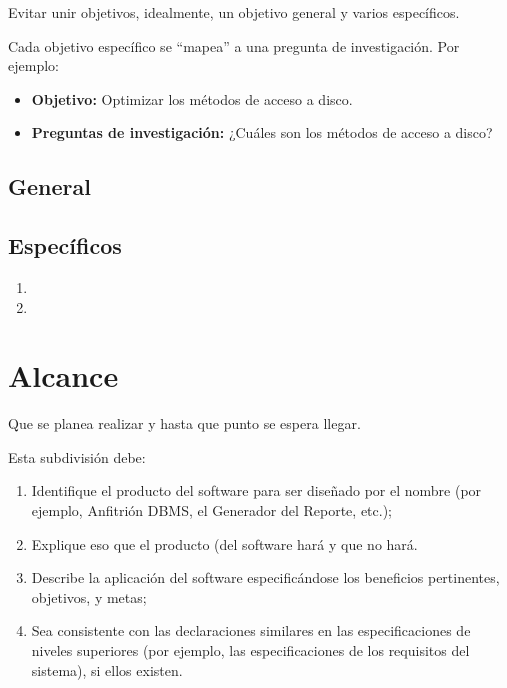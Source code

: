\documentclass[letter,12pt]{report}
\newcommand\naranjo[1]{\textcolor[rgb]{1.00,0.36,0.06}{\textbf{#1}}}
\begin{document}
Evitar unir objetivos, idealmente, un objetivo general y varios específicos.

Cada objetivo específico se ``mapea'' a una pregunta de investigación.
Por ejemplo:
  \begin{itemize}
  \item \textbf{\naranjo{Objetivo:}} Optimizar los métodos de acceso a disco.
  \item \textbf{\naranjo{Preguntas de investigación:}} ¿Cuáles son los métodos de acceso a disco?
\end{itemize}
\subsection{General}
\blindtext %

\subsection{Específicos}
\begin{enumerate}\justifying
  \item \blindtext %
 
  \item \blindtext %

\end{enumerate}

\section{Alcance}
Que se planea realizar y hasta que punto se espera llegar.

Esta subdivisión debe:
\begin{enumerate}\justifying
  \item Identifique el producto del software para ser diseñado por el nombre (por ejemplo, Anfitrión DBMS, el Generador del Reporte, etc.);
  \item Explique eso que el producto (del software hará y que no hará.
  \item Describe la aplicación del software especificándose los beneficios pertinentes, objetivos, y metas;
  \item Sea consistente con las declaraciones similares en las especificaciones de niveles superiores (por ejemplo, las especificaciones de los requisitos del sistema), si ellos existen.
\end{enumerate}
\end{document}
